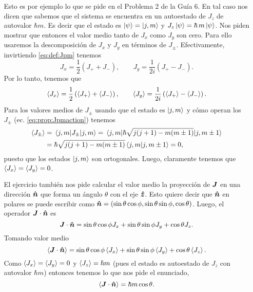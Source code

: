 \documentclass[10pt, a4paper]{article}
\newcommand{\jpmprefact}{\hbar\sqrt{j(j+1) - m(m\pm1)}}
\numberwithin{equation}{subsection}
\begin{document}
Esto es por ejemplo lo que se pide en el Problema 2 de la Guía 6. En tal caso
nos dicen que sabemos que el sistema se encuentra en un autoestado de $J_z$ de
autovalor $\hbar m$. Es decir que el estado es $\ket{\psi} = \ket{j,m}$  y
$J_z\ket{\psi} = \hbar\,m\ket{\psi}$. Nos piden mostrar que entonces el valor
medio tanto de $J_x$ como $J_y$ son cero. Para ello usaremos la descomposición
de $J_x$ y $J_y$ en términos de $J_\pm$. Efectivamente, invirtiendo
\eqref{eq:def:Jpm} tenemos
\begin{equation} \label{eq:prop:JxJyJpmdescomp}
  J_x = \frac{1}{2}\left(J_+ + J_-\right), \qquad
  J_y = \frac{1}{2i}\left(J_+ - J_-\right).
\end{equation}
Por lo tanto, tenemos que
\begin{equation}
  \expval{J_x} = \frac{1}{2}\left(\expval{J_+} + \expval{J_-}\right), \qquad
  \expval{J_y} = \frac{1}{2i}\left(\expval{J_+} - \expval{J_-}\right).
\end{equation}
Para los valores medios de $J_\pm$ usando que el estado es $\ket{j,m}$ y cómo
operan los $J_\pm$ (ec. \eqref{eq:prop:Jpmaction}) tenemos
\begin{align}
  \expval{J_\pm} &= \expval{J_\pm}{j,m} = \matrixel{j,m}{\jpmprefact}{j,m\pm1}
    \nonumber \\
  &= \jpmprefact\braket{j,m}{j,m\pm1} = 0,
\end{align}
puesto que los estados $\ket{j,m}$ son ortogonales. Luego, claramente tenemos
que $\expval{J_x} = \expval{J_y} = 0$.

\bigbreak


\bigbreak

El ejercicio también nos pide calcular el valor medio la proyección de
$\vb*{J}$ en una dirección $\vu*{n}$ que forma un ángulo $\theta$ con el eje
$\vu*{z}$.  Esto quiere decir que $\vu*{n}$ en polares se puede escribir como
$\vu*{n} = (\sin\theta\cos\phi, \sin\theta\sin\phi, \cos\theta)$. Luego, el
operador $\vb*{J}\cdot\vu*{n}$ es
\begin{equation}
  \vb*{J}\cdot\vu*{n} = \sin\theta\cos\phi J_x + \sin\theta\sin\phi J_y +
    \cos\theta J_z.
\end{equation}
Tomando valor medio
\begin{equation}
  \expval{\vb*{J}\cdot\vu*{n}} = \sin\theta\cos\phi\expval{J_x} +
    \sin\theta\sin\phi\expval{J_y} + \cos\theta\expval{J_z}.
\end{equation}
Como $\expval{J_x} = \expval{J_y} = 0$ y $\expval{J_z} = \hbar m$ (pues el
estado es autoestado de $J_z$ con autovalor $\hbar m$) entonces tenemos lo que
nos pide el enunciado,
\begin{equation}
  \expval{\vb*{J}\cdot\vu*{n}} = \hbar m \cos\theta.
\end{equation}
\end{document}
